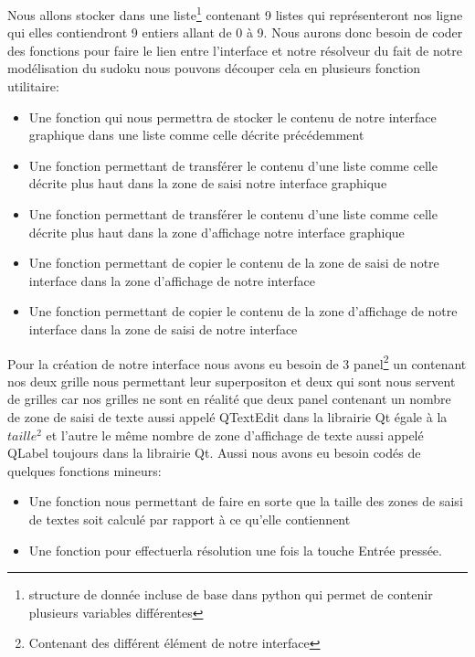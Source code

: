 Nous allons stocker dans une liste\footnote{\label{liste_Python}structure de donnée incluse de base dans python qui permet de contenir plusieurs variables différentes} contenant 9 listes qui représenteront nos ligne qui elles contiendront 9 entiers allant de 0 à 9. Nous aurons donc besoin de coder des fonctions pour faire le lien entre l'interface et notre résolveur du fait de notre modélisation du sudoku nous pouvons découper cela en plusieurs fonction utilitaire:\newline
\begin{itemize}
\item Une fonction qui nous permettra de stocker le contenu de notre interface graphique dans une liste comme celle décrite précédemment
\item Une fonction permettant de transférer le contenu d'une liste comme celle décrite plus haut dans la zone de saisi notre interface graphique
\item Une fonction permettant de transférer le contenu d'une liste comme celle décrite plus haut dans la zone d'affichage notre interface graphique
\item Une fonction permettant de copier le contenu de la zone de saisi de notre interface dans la zone d'affichage de notre interface
\item Une fonction permettant de copier le contenu de la zone d'affichage de notre interface dans la zone de saisi de notre interface
\end{itemize}
\newline
Pour la création de notre interface nous avons eu besoin de 3 panel\footnote{Contenant des différent élément de notre interface} un contenant nos deux grille nous permettant leur superpositon et deux qui sont nous servent de grilles car nos grilles ne sont en réalité que deux panel contenant un nombre de zone de saisi de texte aussi appelé QTextEdit dans la librairie Qt égale à la $taille^{2}$ et l'autre le même nombre de zone d'affichage de texte aussi appelé QLabel toujours dans la librairie Qt. Aussi nous avons eu besoin codés de quelques fonctions mineurs:\newline

\begin{itemize}
\item Une fonction nous permettant de faire en sorte que la taille des zones de saisi de textes soit calculé par rapport à ce qu'elle contiennent
\item Une fonction pour effectuerla résolution une fois la touche Entrée pressée.
\end{itemize}

